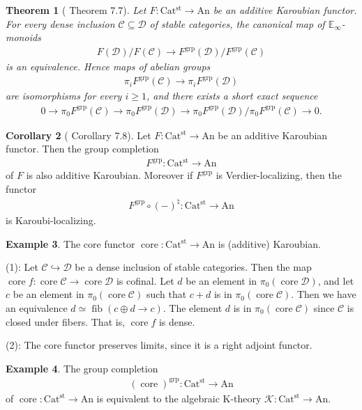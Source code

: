 \documentclass[a4paper,dvipdfmx,11pt,reqno]{amsart}
\DeclareMathOperator{\fib}{fib}
\newcommand{\C}{\mathcal{C}}
\newcommand{\D}{\mathcal{D}}
\newcommand{\K}{\mathcal{K}}
\DeclareMathOperator{\core}{core}
\DeclareMathOperator{\grp}{grp}
\newcommand{\An}{\mathrm{An}}
\newcommand{\Catst}{\mathrm{Cat^{st}}}
\newcommand{\Einf}{\mathbb{E}_{\infty}}
\newtheorem{theorem}{Theorem}[section]
\theoremstyle{definition}
\newtheorem{corollary}[theorem]{Corollary}
\newtheorem{example}[theorem]{Example}
\begin{document}
\begin{theorem}[\cite{HLS23} Theorem 7.7] \label{HLS23.thrm.7.7}
  Let $F : \Catst \to \An$ be an additive Karoubian functor.
  For every dense inclusion $\C \subseteq \D$ of stable categories, the canonical map of $\Einf$-monoids
  \begin{align*}
    F(\D)/F(\C) \to F^{\grp}(\D)/F^{\grp}(\C)
  \end{align*}
  is an equivalence.
  Hence maps of abelian groups
  \begin{align*}
    \pi_iF^{\grp}(\C) \to \pi_iF^{\grp}(\D)
  \end{align*}
  are isomorphisms for every $i \geq 1$, and there exists a short exact sequence 
  \begin{align*}
    0 \to \pi_0F^{\grp}(\C) \to \pi_0F^{\grp}(\D) \to \pi_0F^{\grp}(\D)/\pi_0F^{\grp}(\C) \to 0.
  \end{align*}
\end{theorem}

\begin{corollary}[\cite{HLS23} Corollary 7.8] \label{HLS23.cor.7.8}
  Let $F : \Catst \to \An$ be an additive Karoubian functor.
  Then the group completion 
  \begin{align*}
    F^{\grp} : \Catst \to \An
  \end{align*}
  of $F$ is also additive Karoubian.
  Moreover if $F^{\grp}$ is Verdier-localizing, then the functor
  \begin{align*}
    F^{\grp} \circ (-)^{\natural} : \Catst \to \An
  \end{align*}
  is Karoubi-localizing.
\end{corollary}

\begin{example} \label{Ber.rem.5.50}
  The core functor $\core : \Catst \to \An$ is (additive) Karoubian.

  (1):
  Let $\C \hookrightarrow \D$ be a dense inclusion of stable categories.
  Then the map $\core f : \core\C \to \core\D$ is cofinal.
  Let $d$ be an element in $\pi_0(\core\D)$, and let $c$ be an element in $\pi_0(\core\C)$ such that $c+d$ is in $\pi_0(\core\C)$.
  Then we have an equivalence $d \simeq \fib(c \oplus d \to c)$.
  The element $d$ is in $\pi_0(\core\C)$ since $\C$ is closed under fibers.
  That is, $\core f$ is dense.

  (2):
  The core functor preserves limits, since it is a right adjoint functor.
\end{example}

\begin{example} \label{eg.group_completion_of_core}
  The group completion 
  \begin{align*}
    (\core)^{\grp} : \Catst \to \An
  \end{align*}
  of $\core : \Catst \to \An$ is equivalent to the algebraic K-theory $\K : \Catst \to \An$.
\end{example}
\end{document}
